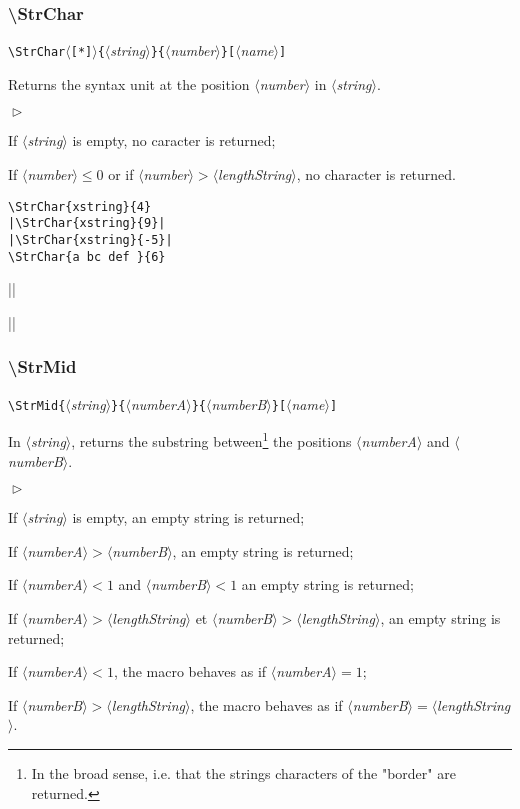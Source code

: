 \documentclass[a4paper,10pt]{article}
\newcommand\guill[1]{"#1"}
\newcommand\argu[1]{$\langle$\textit{#1}$\rangle$}
\newcommand\ARGU[1]{\texttt{\{}\argu{#1}\texttt{\}}}
\newcommand\arguC[1]{\texttt{[}\argu{#1}\texttt{]}}
\newcommand\etoile{$\langle$\texttt{[*]}$\rangle$}
\newenvironment{Conditions}[1][1cm]%
{\begin{list}%
	{$\vartriangleright$}%
	{\setlength{\leftmargin}{#1}
	 \setlength{\itemsep}{0pt}
	 \setlength{\parsep}{0pt}
	 \setlength{\topsep}{2ptplus3ptminus2pt}
	}}%
{\end{list}}
\newcommand\US{syntax unit\xspace}
\newcommand\styleexemple{\small\vskip4pt}
\newcommand\verbinline{\lstinline[basicstyle=\normalsize\ttfamily]}
\begin{document}
\subsubsection{\ttfamily\textbackslash StrChar}

\verbinline|\StrChar|\etoile\ARGU{string}\ARGU{number}\arguC{name}
\smallskip

Returns the \US at the position \argu{number} in \argu{string}.\medskip

\begin{Conditions}
\item If \argu{string} is empty, no caracter is returned;
\item If \argu{number}${}\leqslant0$ or if \argu{number}${}>{}$\argu{lengthString}, no character is returned.
\end{Conditions}

\begin{minipage}[t]{0.65\linewidth}
\begin{lstlisting}
\StrChar{xstring}{4}
|\StrChar{xstring}{9}|
|\StrChar{xstring}{-5}|
\StrChar{a bc def }{6}
\end{lstlisting}%
\end{minipage}\hfill
\begin{minipage}[t]{0.35\linewidth}
	\styleexemple
	\par
	||\par
	||\par
\end{minipage}%

\subsubsection{\ttfamily\textbackslash StrMid}

\verbinline|\StrMid|\ARGU{string}\ARGU{numberA}\ARGU{numberB}\arguC{name}
\smallskip

In \argu{string}, returns the substring between\footnote{In the broad sense, i.e. that the strings characters of the \guill{border} are returned.} the positions \argu{numberA} and \argu{numberB}.\medskip

\begin{Conditions}
\item If \argu{string} is empty, an empty string is returned;
\item If \argu{numberA}${}>{}$\argu{numberB}, an empty string is returned;
\item If \argu{numberA}${}<1$ and \argu{numberB}${}<1$ an empty string is returned;
\item If \argu{numberA}${}>{}$\argu{lengthString} et \argu{numberB}${}>{}$\argu{lengthString}, an empty string is returned;
\item If \argu{numberA}${}<1$, the macro behaves as if \argu{numberA}${}=1$;
\item If \argu{numberB}${}>{}$\argu{lengthString}, the macro behaves as if \argu{numberB}${}={}$\argu{lengthString}.
\end{Conditions}
\end{document}
